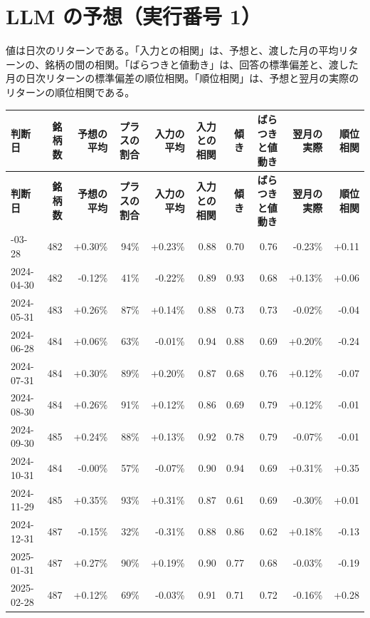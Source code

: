 \documentclass[xelatex,ja=standard,jafont=hiragino-pron,a4paper,10pt]{bxjsreport}
\begin{document}
\section{LLM の予想（実行番号 1）}

値は日次のリターンである。「入力との相関」は、予想と、渡した月の平均リターンの、銘柄の間の相関。「ばらつきと値動き」は、回答の標準偏差と、渡した月の日次リターンの標準偏差の順位相関。「順位相関」は、予想と翌月の実際のリターンの順位相関である。

{\scriptsize
\begin{longtable}{lrrrrrrrrr}
\toprule
\textbf{判断日} & \textbf{銘柄数} & \textbf{予想の平均} & \textbf{プラスの割合} & \textbf{入力の平均} & \textbf{入力との相関} & \textbf{傾き} & \textbf{ばらつきと値動き} & \textbf{翌月の実際} & \textbf{順位相関} \\
\midrule
\endfirsthead
\toprule
\textbf{判断日} & \textbf{銘柄数} & \textbf{予想の平均} & \textbf{プラスの割合} & \textbf{入力の平均} & \textbf{入力との相関} & \textbf{傾き} & \textbf{ばらつきと値動き} & \textbf{翌月の実際} & \textbf{順位相関} \\
\midrule
\endhead
\bottomrule
\endfoot
2024-03-28 & 482 & +0.30\% & 94\% & +0.23\% & 0.88 & 0.70 & 0.76 & -0.23\% & +0.11 \\
2024-04-30 & 482 & -0.12\% & 41\% & -0.22\% & 0.89 & 0.93 & 0.68 & +0.13\% & +0.06 \\
2024-05-31 & 483 & +0.26\% & 87\% & +0.14\% & 0.88 & 0.73 & 0.73 & -0.02\% & -0.04 \\
2024-06-28 & 484 & +0.06\% & 63\% & -0.01\% & 0.94 & 0.88 & 0.69 & +0.20\% & -0.24 \\
2024-07-31 & 484 & +0.30\% & 89\% & +0.20\% & 0.87 & 0.68 & 0.76 & +0.12\% & -0.07 \\
2024-08-30 & 484 & +0.26\% & 91\% & +0.12\% & 0.86 & 0.69 & 0.79 & +0.12\% & -0.01 \\
2024-09-30 & 485 & +0.24\% & 88\% & +0.13\% & 0.92 & 0.78 & 0.79 & -0.07\% & -0.01 \\
2024-10-31 & 484 & -0.00\% & 57\% & -0.07\% & 0.90 & 0.94 & 0.69 & +0.31\% & +0.35 \\
2024-11-29 & 485 & +0.35\% & 93\% & +0.31\% & 0.87 & 0.61 & 0.69 & -0.30\% & +0.01 \\
2024-12-31 & 487 & -0.15\% & 32\% & -0.31\% & 0.88 & 0.86 & 0.62 & +0.18\% & -0.13 \\
2025-01-31 & 487 & +0.27\% & 90\% & +0.19\% & 0.90 & 0.77 & 0.68 & -0.03\% & -0.19 \\
2025-02-28 & 487 & +0.12\% & 69\% & -0.03\% & 0.91 & 0.71 & 0.72 & -0.16\% & +0.28 \\

\end{longtable}}
\end{document}
